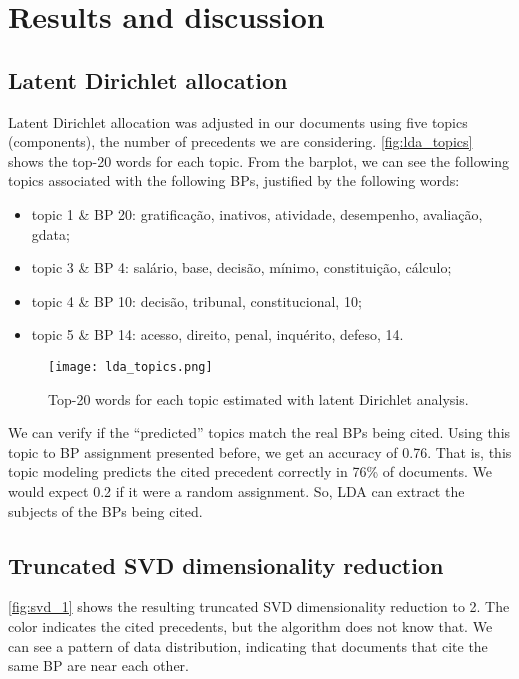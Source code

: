 \section{Results and discussion}
    \label{sec:results}

    \subsection{Latent Dirichlet allocation}

        Latent Dirichlet allocation was adjusted in our documents using five topics (components), the number of precedents we are considering. \autoref{fig:lda_topics} shows the top-20 words for each topic. From the barplot, we can see the following topics associated with the following BPs, justified by the following words:
        \begin{itemize}
                \item topic 1 \& BP 20: gratificação, inativos, atividade, desempenho, avaliação, gdata;
                \item topic 3 \& BP 4: salário, base, decisão, mínimo, constituição, cálculo;
                \item topic 4 \& BP 10: decisão, tribunal, constitucional, 10;
                \item topic 5 \& BP 14: acesso, direito, penal, inquérito, defeso, 14.
        \end{itemize}

        \begin{figure*}[!h]
                \texttt{[image: lda\_topics.png]}
                \caption{Top-20 words for each topic estimated with latent Dirichlet analysis.}
                \label{fig:lda_topics}
        \end{figure*}

        We can verify if the ``predicted'' topics match the real BPs being cited. Using this topic to BP assignment presented before, we get an accuracy of 0.76. That is, this topic modeling predicts the cited precedent correctly in 76\% of documents. We would expect 0.2 if it were a random assignment. So, LDA can extract the subjects of the BPs being cited.

    \subsection{Truncated SVD dimensionality reduction}

        \autoref{fig:svd_1} shows the resulting truncated SVD dimensionality reduction to 2. The color indicates the cited precedents, but the algorithm does not know that. We can see a pattern of data distribution, indicating that documents that cite the same BP are near each other.

